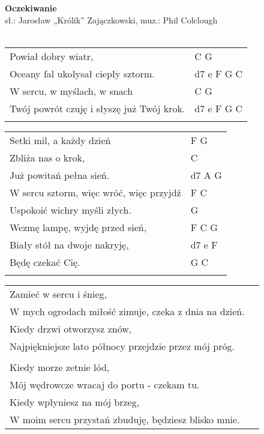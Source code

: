 \documentclass[a5paper]{article}
\begin{document}


\noindent
\fontsize{12pt}{15pt}\selectfont
\textbf{Oczekiwanie} \\
\fontsize{8pt}{10pt}\selectfont
sł.: Jarosław „Królik” Zajączkowski, muz.:  Phil Colclough\\ \\
\fontsize{10pt}{12pt}\selectfont
{}
\begin{tabular}{@{}p{8.50cm}p{3cm}@{}}
\noindent
Powiał dobry wiatr, & C G \\
Oceany fal ukołysał ciepły sztorm. & d7 e F G C \\
W sercu, w myślach, w snach & C G \\
Twój powrót czuję i słyszę już Twój krok. & d7 e F G C \\ \\
\end{tabular}

\noindent
\begin{tabular}{@{}p{7.50cm}p{3cm}@{}}
Setki mil, a każdy dzień & F G \\
Zbliża nas o krok, & C \\
Już powitań pełna sień. & d7 A G \\
W sercu sztorm, więc wróć, więc przyjdź & F C \\
Uspokoić wichry myśli złych. & G \\
Wezmę lampę, wyjdę przed sień, & F C G \\
Biały stół na dwoje nakryję, & d7 e F \\
Będę czekać Cię. & G C \\ \\
\end{tabular}

\noindent
\begin{tabular}{@{}p{8.50cm}p{3cm}@{}}
Zamieć w sercu i śnieg,\\
W mych ogrodach miłość zimuje, czeka z dnia na dzień.\\
Kiedy drzwi otworzysz znów,\\
Najpiękniejsze lato północy przejdzie przez mój próg.\\ \\

Kiedy morze zetnie lód,\\
Mój wędrowcze wracaj do portu - czekam tu.\\
Kiedy wpłyniesz na mój brzeg,\\
W moim sercu przystań zbuduję, będziesz blisko mnie.
\end{tabular}
\end{document}
